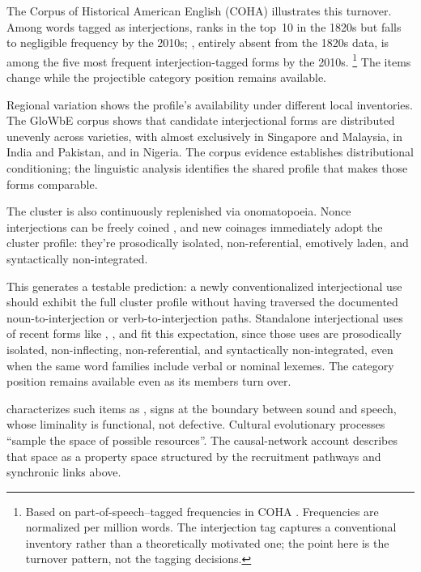 \documentclass[12pt]{article}
\begin{document}
The Corpus of Historical American English (COHA) illustrates this
turnover. Among words tagged as interjections,  ranks in
the top~10 in the 1820s but falls to negligible frequency by the 2010s;
, entirely absent from the 1820s data, is among the five
most frequent interjection-tagged forms by the 2010s.%
\footnote{Based on part-of-speech--tagged frequencies in COHA \citep{davies2010}.
  Frequencies are normalized per million words. The interjection tag
  captures a conventional inventory rather than a theoretically motivated
  one; the point here is the turnover pattern, not the tagging decisions.}
The items change while the projectible category position remains
available.

Regional variation shows the profile's availability under different
local inventories.
The GloWbE corpus \citep[1.9~billion words across 20 English-speaking
countries]{daviesfuchs2015} shows that candidate interjectional forms
are distributed unevenly across varieties, with  almost
exclusively in Singapore and Malaysia,  in India and
Pakistan, and  in Nigeria. The corpus evidence establishes
distributional conditioning; the linguistic analysis identifies the
shared profile that makes those forms comparable.

The cluster is also continuously replenished via onomatopoeia. Nonce
interjections can be freely coined \citep[74]{quirk1985}, and new coinages
immediately adopt the cluster profile: they're prosodically isolated,
non-referential, emotively laden, and syntactically non-integrated.

This generates a testable prediction: a newly conventionalized
interjectional use should exhibit the full cluster profile without
having traversed the documented noun-to-interjection or
verb-to-interjection paths. Standalone interjectional uses of recent
forms like , , and  fit this
expectation, since those uses are prosodically isolated, non-inflecting,
non-referential, and syntactically non-integrated, even when the same
word families include verbal or nominal lexemes. The category position remains
available even as its members turn over.

\textcite{dingemanse2020} characterizes such items as ,
signs at the boundary between sound and speech, whose liminality is
functional, not defective. Cultural evolutionary processes \enquote{sample
the space of possible resources}. The causal-network account
describes that space as a property space structured by
the recruitment pathways and synchronic links above.
\end{document}
